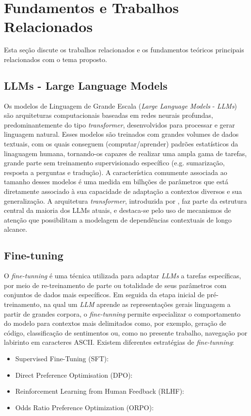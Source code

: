 \section{Fundamentos e Trabalhos Relacionados}

Esta seção discute os trabalhos relacionados e os fundamentos teóricos principais relacionados com o tema proposto.

\subsection{LLMs - Large Language Models}

Os modelos de Linguagem de Grande Escala (\textit{Large Language Models} - \textit{LLMs}) são arquiteturas computacionais baseadas em redes neurais profundas, predominantemente do tipo \textit{transformer}, desenvolvidos para processar e gerar linguagem natural. Esses modelos são treinados com grandes volumes de dados textuais, com os quais conseguem (computar/aprender) padrões estatísticos da linaguagem humana, tornando-os capazes de realizar uma ampla gama de tarefas, grande parte sem treinamento supervisionado específico (e.g. sumarização, resposta a perguntas e tradução). A característica comumente associada ao tamanho desses modelos é uma medida em bilhções de parâmetros que está diretamente associado à sua capacidade de adaptação a contextos diversos e sua generalização. A arquitetura \textit{transformer}, introduzida por \cite{vaswani2023transformers}, faz parte da estrutura central da maioria dos LLMs atuais, e destaca-se pelo uso de mecanismos de atenção que possibilitam a modelagem de dependências contextuais de longo alcance. 

\subsection{Fine-tuning}

O \textit{fine-tunning} é uma técnica utilizada para adaptar \textit{LLMs} a tarefas específicas, por meio de re-treinamento de parte ou totalidade de seus parâmetros com conjuntos de dados mais específicos. Em seguida da etapa inicial de pré-treinamento, na qual um \textit{LLM} aprende as representações gerais linguagem a partir de grandes corpora, o \textit{fine-tunning} permite especializar o comportamento do modelo para contextos mais delimitados como, por exemplo, geração de código, classificação de sentimentos ou, como no presente trabalho, navegação por labirinto em caracteres ASCII. Existem diferentes estratégias de \textit{fine-tunning}:
\begin{itemize}
    \item Supervised Fine-Tuning (SFT): 
    \item Direct Preference Optimisation (DPO): 
    \item Reinforcement Learning from Human Feedback (RLHF): 
    \item Odds Ratio Preference Optimization (ORPO): 
\end{itemize}

